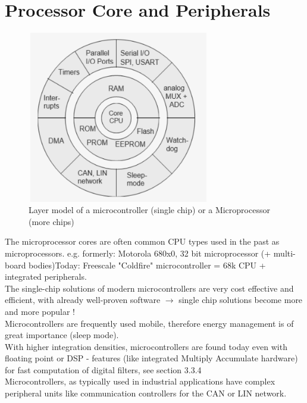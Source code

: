 \section{Processor Core and Peripherals}

    \begin{figure}[h]
    \centering
    \includegraphics[width=8cm, height=7.5cm]{Images/image160.png}
    \caption{Layer model of a microcontroller (single chip) or a Microprocessor (more chips)}
    \label{fig:Fig 112}
    \end{figure}

The microprocessor cores are often common CPU types used in the past as microprocessors. e.g. formerly: Motorola 680x0, 32 bit microprocessor (+ multi-board bodies)Today: Freescale "Coldfire" microcontroller = 68k CPU + integrated peripherals. \\

The single-chip solutions of modern microcontrollers are very cost effective and efficient, with already well-proven software $\rightarrow$ single chip solutions become more and more popular !\\

Microcontrollers are frequently used mobile, therefore energy management is of great importance (sleep mode).\\

With higher integration densities, microcontrollers are found today even with floating point or DSP - features (like integrated Multiply Accumulate hardware) for fast computation of digital filters, see section 3.3.4\\

Microcontrollers, as typically used in industrial applications have complex peripheral units like communication controllers for the CAN or LIN network.\\

